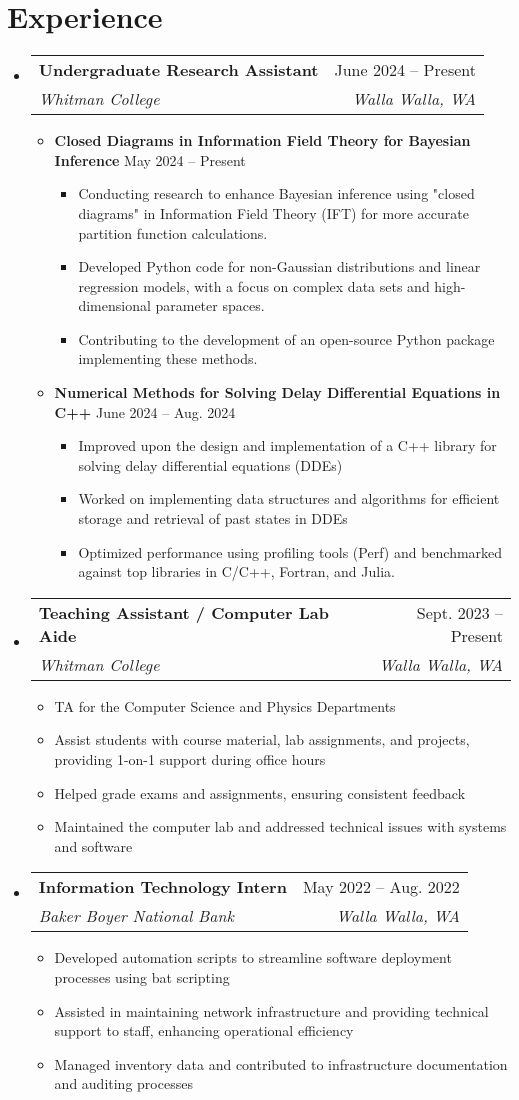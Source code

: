 \documentclass[letterpaper,11pt]{article}
\makeatletter
\newcommand{\resumeItem}[1]{\item\small{#1 \vspace{-2pt}}}
\newcommand{\resumeSubheading}[4]{
  \vspace{-2pt}\item
    \begin{tabular*}{0.97\textwidth}[t]{l@{\extracolsep{\fill}}r}
      \textbf{#1} & #2 \\
      \textit{\small#3} & \textit{\small #4} \\
    \end{tabular*}\vspace{-7pt}
}
\newcommand{\resumeSubHeadingListStart}{\begin{itemize}[leftmargin=0.15in, label={}]}
\newcommand{\resumeSubHeadingListEnd}{\end{itemize}}
\newcommand{\resumeItemListStart}{\begin{itemize}}
\newcommand{\resumeItemListEnd}{\end{itemize}\vspace{-5pt}}
\makeatother
\begin{document}
\section{Experience}
  \resumeSubHeadingListStart
    \resumeSubheading
      {Undergraduate Research Assistant}{June 2024 -- Present}
      {Whitman College}{Walla Walla, WA}
      \resumeItemListStart
        \resumeItem{\textbf{Closed Diagrams in Information Field Theory for Bayesian Inference}}\hspace{0.85 in} {May 2024 -- Present}
        \resumeItemListStart
            \resumeItem{Conducting research to enhance Bayesian inference using "closed diagrams" in Information Field Theory (IFT) for more accurate partition function calculations.}
            \resumeItem{Developed Python code for non-Gaussian distributions and linear regression models, with a focus on complex data sets and high-dimensional parameter spaces.}
            \resumeItem{Contributing to the development of an open-source Python package implementing these methods.}
        \resumeItemListEnd
        \resumeItem{\textbf{Numerical Methods for Solving Delay Differential Equations in C++} \hspace{0.55 in} {June 2024 -- Aug. 2024}}
        \resumeItemListStart
            \resumeItem{Improved upon the design and implementation of a C++ library for solving delay differential equations (DDEs)}
            \resumeItem{Worked on implementing data structures and algorithms for efficient storage and retrieval of past states in DDEs}
            \resumeItem{Optimized performance using profiling tools (Perf) and benchmarked against top libraries in C/C++, Fortran, and Julia.}
        \resumeItemListEnd

      \resumeItemListEnd

    \resumeSubheading
    {Teaching Assistant / Computer Lab Aide}{Sept. 2023 -- Present}
    {Whitman College}{Walla Walla, WA}
    \resumeItemListStart
        \resumeItem{TA for the Computer Science and Physics Departments}
        \resumeItem{Assist students with course material, lab assignments, and projects, providing 1-on-1 support during office hours}
        \resumeItem{Helped grade exams and assignments, ensuring consistent feedback}
        \resumeItem{Maintained the computer lab and addressed technical issues with systems and software}
    \resumeItemListEnd

    \resumeSubheading
    {Information Technology Intern}{May 2022 -- Aug. 2022}
    {Baker Boyer National Bank}{Walla Walla, WA}
    \resumeItemListStart
      \resumeItem{Developed automation scripts to streamline software deployment processes using bat scripting}
      \resumeItem{Assisted in maintaining network infrastructure and providing technical support to staff, enhancing operational efficiency}
      \resumeItem{Managed inventory data and contributed to infrastructure documentation and auditing processes}
    \resumeItemListEnd
  \resumeSubHeadingListEnd
\end{document}
